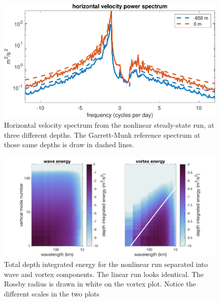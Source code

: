 \documentclass[10pt]{article}
\begin{document}
\begin{figure}[t]
  \centerline{\includegraphics[width=39pc,angle=0]{figures/HorizontalVelocitySpectrum}}
  \caption{Horizontal velocity spectrum from the nonlinear steady-state run, at three different depths. The Garrett-Munk reference spectrum at those same depths is draw in dashed lines.}
  \label{HorizontalVelocitySpectrum}
\end{figure}

\begin{figure}[t]
  \centerline{\includegraphics[width=39pc,angle=0]{figures/Energy-nonlinear}}
  \caption{Total depth integrated energy for the nonlinear run separated into wave and vortex components. The linear run looks identical. The Rossby radius is drawn in white on the vortex plot. Notice the different scales in the two plots}
  \label{Energy-nonlinear}
\end{figure}
\end{document}
